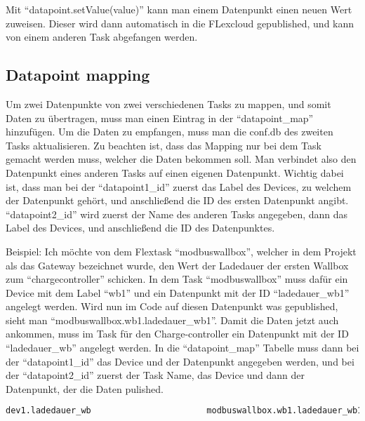Mit “datapoint.setValue(value)” kann man einem Datenpunkt einen neuen Wert zuweisen. Dieser wird dann automatisch in die FLexcloud gepublished, und kann von einem anderen Task abgefangen werden.  


\subsection{Datapoint mapping}

Um zwei Datenpunkte von zwei verschiedenen Tasks zu mappen, und somit Daten zu übertragen, muss man einen Eintrag in der “datapoint\_map” hinzufügen. Um die Daten zu empfangen, muss man die conf.db des zweiten Tasks aktualisieren. Zu beachten ist, dass das Mapping nur bei dem Task gemacht werden muss, welcher die Daten bekommen soll. Man verbindet also den Datenpunkt eines anderen Tasks auf einen eigenen Datenpunkt. Wichtig dabei ist, dass man bei der “datapoint1\_id” zuerst das Label des Devices, zu welchem der Datenpunkt gehört, und anschließend die ID des ersten Datenpunkt angibt. “datapoint2\_id” wird zuerst der Name des anderen Tasks angegeben, dann das Label des Devices, und anschließend die ID des Datenpunktes. 

 

Beispiel: Ich möchte von dem Flextask “modbuswallbox”, welcher in dem Projekt als das Gateway bezeichnet wurde, den Wert der Ladedauer der ersten Wallbox zum “chargecontroller” schicken. In dem Task “modbuswallbox” muss dafür ein Device mit dem Label “wb1” und ein Datenpunkt mit der ID “ladedauer\_wb1” angelegt werden. Wird nun im Code auf diesen Datenpunkt was gepublished, sieht man “modbuswallbox.wb1.ladedauer\_wb1”. Damit die Daten jetzt auch ankommen, muss im Task für den Charge-controller ein Datenpunkt mit der ID “ladedauer\_wb” angelegt werden. In die “datapoint\_map” Tabelle muss dann bei der “datapoint1\_id” das Device und der Datenpunkt angegeben werden, und bei der “datapoint2\_id” zuerst der Task Name, das Device und dann der Datenpunkt, der die Daten pulished. 

\begin{lstlisting}[language=sql,caption=Example Element,label=lst:impl:foo]
    dev1.ladedauer_wb                       modbuswallbox.wb1.ladedauer_wb1
\end{lstlisting}